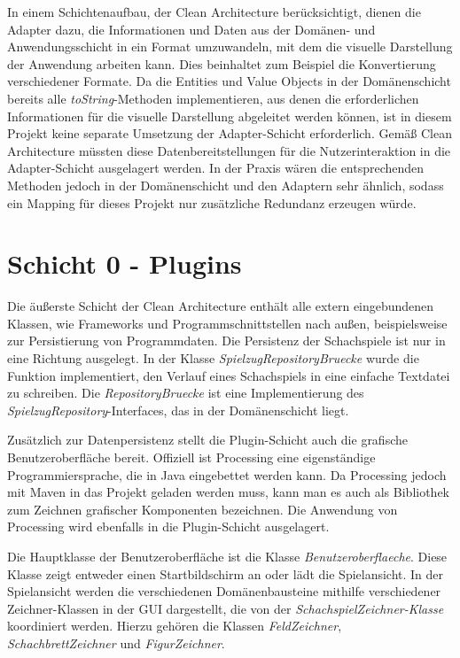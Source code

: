 In einem Schichtenaufbau, der Clean Architecture berücksichtigt, dienen die Adapter dazu, die Informationen und Daten aus der Domänen- und Anwendungsschicht in ein Format umzuwandeln, mit dem die visuelle Darstellung der Anwendung arbeiten kann. 
Dies beinhaltet zum Beispiel die Konvertierung verschiedener Formate. 
Da die Entities und Value Objects in der Domänenschicht bereits alle \textit{toString}-Methoden implementieren, aus denen die erforderlichen Informationen für die visuelle Darstellung abgeleitet werden können, ist in diesem Projekt keine separate Umsetzung der Adapter-Schicht erforderlich. 
Gemäß Clean Architecture müssten diese Datenbereitstellungen für die Nutzerinteraktion in die Adapter-Schicht ausgelagert werden. 
In der Praxis wären die entsprechenden Methoden jedoch in der Domänenschicht und den Adaptern sehr ähnlich, sodass ein Mapping für dieses Projekt nur zusätzliche Redundanz erzeugen würde.

\section{Schicht 0 - Plugins}

Die äußerste Schicht der Clean Architecture enthält alle extern eingebundenen Klassen, wie Frameworks und Programmschnittstellen nach außen, beispielsweise zur Persistierung von Programmdaten. 
Die Persistenz der Schachspiele ist nur in eine Richtung ausgelegt. 
In der Klasse \textit{SpielzugRepositoryBruecke} wurde die Funktion implementiert, den Verlauf eines Schachspiels in eine einfache Textdatei zu schreiben. 
Die \textit{RepositoryBruecke} ist eine Implementierung des \textit{SpielzugRepository}-Interfaces, das in der Domänenschicht liegt.

Zusätzlich zur Datenpersistenz stellt die Plugin-Schicht auch die grafische Benutzeroberfläche bereit. 
Offiziell ist Processing eine eigenständige Programmiersprache, die in Java eingebettet werden kann. 
Da Processing jedoch mit Maven in das Projekt geladen werden muss, kann man es auch als \glqq Bibliothek zum Zeichnen grafischer Komponenten\grqq{} bezeichnen. 
Die Anwendung von Processing wird ebenfalls in die Plugin-Schicht ausgelagert.

Die Hauptklasse der Benutzeroberfläche ist die Klasse \textit{Benutzeroberflaeche}.
Diese Klasse zeigt entweder einen Startbildschirm an oder lädt die Spielansicht.
In der Spielansicht werden die verschiedenen Domänenbausteine mithilfe verschiedener Zeichner-Klassen in der GUI dargestellt, die von der \textit{SchachspielZeichner-Klasse} koordiniert werden. 
Hierzu gehören die Klassen \textit{FeldZeichner}, \textit{SchachbrettZeichner} und \textit{FigurZeichner}.

